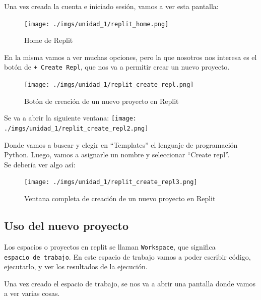 \documentclass[
  letterpaper,
  DIV=11,
  numbers=noendperiod]{scrreprt}
\begin{document}
Una vez creada la cuenta e iniciado sesión, vamos a ver esta pantalla:

\begin{figure}[H]

{\centering \texttt{[image: ./imgs/unidad\_1/replit\_home.png]}

}

\caption{Home de Replit}

\end{figure}%

En la misma vamos a ver muchas opciones, pero la que nosotros nos
interesa es el botón de \texttt{+\ Create\ Repl}, que nos va a permitir
crear un nuevo proyecto.

\begin{figure}[H]

{\centering \texttt{[image: ./imgs/unidad\_1/replit\_create\_repl.png]}

}

\caption{Botón de creación de un nuevo proyecto en Replit}

\end{figure}%

Se va a abrir la siguiente ventana:
\texttt{[image: ./imgs/unidad\_1/replit\_create\_repl2.png]}

Donde vamos a buscar y elegir en ``Templates'' el lenguaje de
programación Python. Luego, vamos a asignarle un nombre y seleccionar
``Create repl''.\\
Se debería ver algo así:

\begin{figure}[H]

{\centering \texttt{[image: ./imgs/unidad\_1/replit\_create\_repl3.png]}

}

\caption{Ventana completa de creación de un nuevo proyecto en Replit}

\end{figure}%

\subsection{Uso del nuevo proyecto}\label{uso-del-nuevo-proyecto}

Los espacios o proyectos en replit se llaman \texttt{Workspace}, que
significa \texttt{espacio\ de\ trabajo}. En este espacio de trabajo
vamos a poder escribir código, ejecutarlo, y ver los resultados de la
ejecución.

Una vez creado el espacio de trabajo, se nos va a abrir una pantalla
donde vamos a ver varias cosas.
\end{document}
